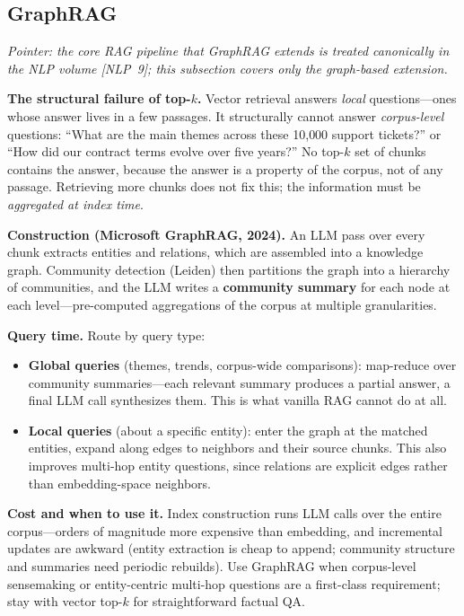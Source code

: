 \subsection{GraphRAG}

\textit{Pointer: the core RAG pipeline that GraphRAG extends is treated canonically in the NLP volume [NLP~9]; this subsection covers only the graph-based extension.}

\textbf{The structural failure of top-$k$.} Vector retrieval answers \textit{local} questions---ones whose answer lives in a few passages. It structurally cannot answer \textit{corpus-level} questions: ``What are the main themes across these 10{,}000 support tickets?'' or ``How did our contract terms evolve over five years?'' No top-$k$ set of chunks contains the answer, because the answer is a property of the corpus, not of any passage. Retrieving more chunks does not fix this; the information must be \textit{aggregated at index time}.

\textbf{Construction (Microsoft GraphRAG, 2024).} An LLM pass over every chunk extracts entities and relations, which are assembled into a knowledge graph. Community detection (Leiden) then partitions the graph into a hierarchy of communities, and the LLM writes a \textbf{community summary} for each node at each level---pre-computed aggregations of the corpus at multiple granularities.

\textbf{Query time.} Route by query type:
\begin{itemize}
    \item \textbf{Global queries} (themes, trends, corpus-wide comparisons): map-reduce over community summaries---each relevant summary produces a partial answer, a final LLM call synthesizes them. This is what vanilla RAG cannot do at all.
    \item \textbf{Local queries} (about a specific entity): enter the graph at the matched entities, expand along edges to neighbors and their source chunks. This also improves multi-hop entity questions, since relations are explicit edges rather than embedding-space neighbors.
\end{itemize}

\textbf{Cost and when to use it.} Index construction runs LLM calls over the entire corpus---orders of magnitude more expensive than embedding, and incremental updates are awkward (entity extraction is cheap to append; community structure and summaries need periodic rebuilds). Use GraphRAG when corpus-level sensemaking or entity-centric multi-hop questions are a first-class requirement; stay with vector top-$k$ for straightforward factual QA.


